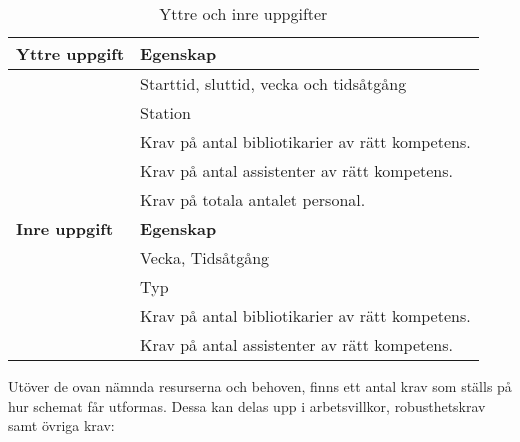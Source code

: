 \begin{table}
\caption{Yttre och inre uppgifter}
\label{tab2}
\begin{tabular}[H]{|l|l|}
\hline
\textbf{Yttre uppgift} & \textbf{Egenskap} \\ \hline
 & Starttid, sluttid, vecka och tidsåtgång \
\\ \hline 
 & Station
\\ \hline 
 & Krav på antal bibliotikarier av rätt kompetens.
\\ \hline 
 & Krav på antal assistenter av rätt kompetens.
\\ \hline 
 & Krav på totala antalet personal.
\\ \hline 

\textbf{Inre uppgift} & \textbf{Egenskap} \\ \hline
 & Vecka, Tidsåtgång \
\\ \hline 
 & Typ
\\ \hline 
 & Krav på antal bibliotikarier av rätt kompetens.
\\ \hline 
 & Krav på antal assistenter av rätt kompetens.
\\ \hline 
\end{tabular}
\end{table}

Utöver de ovan nämnda resurserna och behoven, finns ett antal krav som ställs på hur schemat får utformas. Dessa kan delas upp i arbetsvillkor, robusthetskrav samt övriga krav:

